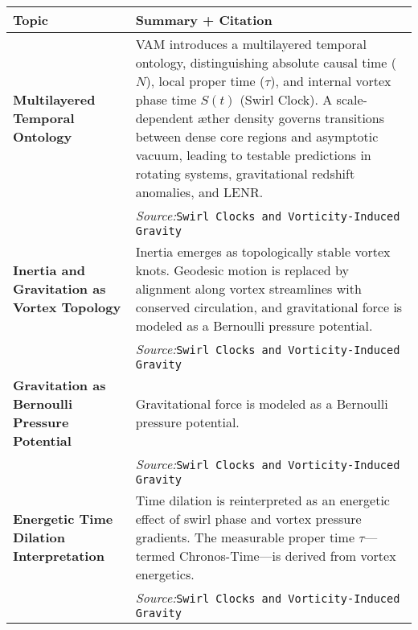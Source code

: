\documentclass[11pt]{article}
\begin{document}
  \titlepageOpen

  \begin{abstract}


  \end{abstract}

  \titlepageClose
  \fi

  \ifdefined\standalonechapter
  \section{\appendixtitle}
  \else
  \fi



\begin{table}[H]
\centering
\begin{tabular}{|p{4.3cm}|p{9.5cm}|}
\hline
\textbf{Topic} & \textbf{Summary + Citation} \\
\hline
\textbf{Multilayered Temporal Ontology} &
VAM introduces a multilayered temporal ontology, distinguishing absolute causal time ($N$), local proper time ($\tau$), and internal vortex phase time $S(t)$ (Swirl Clock). A scale-dependent æther density governs transitions between dense core regions and asymptotic vacuum, leading to testable predictions in rotating systems, gravitational redshift anomalies, and LENR.\\
& \textit{Source:}\texttt{Swirl Clocks and Vorticity-Induced Gravity}\\
\hline

\textbf{Inertia and Gravitation as Vortex Topology} &
Inertia emerges as topologically stable vortex knots. Geodesic motion is replaced by alignment along vortex streamlines with conserved circulation, and gravitational force is modeled as a Bernoulli pressure potential.\\
& \textit{Source:}\texttt{Swirl Clocks and Vorticity-Induced Gravity}\\
\hline

\textbf{Gravitation as Bernoulli Pressure Potential} &
Gravitational force is modeled as a Bernoulli pressure potential.\\
& \textit{Source:}\texttt{Swirl Clocks and Vorticity-Induced Gravity}\\
\hline

\textbf{Energetic Time Dilation Interpretation} &
Time dilation is reinterpreted as an energetic effect of swirl phase and vortex pressure gradients. The measurable proper time $\tau$—termed Chronos-Time—is derived from vortex energetics.\\
& \textit{Source:}\texttt{Swirl Clocks and Vorticity-Induced Gravity}\\
\hline


\end{tabular}
\end{table}
\end{document}
